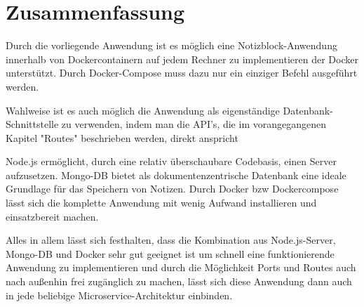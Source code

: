 
\chapter{Zusammenfassung}
\label{ch:Zusammenfassung}

Durch die vorliegende Anwendung ist es möglich eine Notizblock-Anwendung innerhalb von Dockercontainern auf jedem Rechner zu implementieren der Docker unterstützt.
Durch Docker-Compose muss dazu nur ein einziger Befehl ausgeführt werden.

Wahlweise ist es auch möglich die Anwendung als eigenständige Datenbank-Schnittstelle zu verwenden, indem man die API's, die im vorangegangenen Kapitel "Routes" beschrieben werden, direkt anspricht

Node.js ermöglicht, durch eine relativ überschaubare Codebasis, einen Server aufzusetzen.
Mongo-DB bietet als dokumentenzentrische Datenbank eine ideale Grundlage für das Speichern von Notizen.
Durch Docker bzw Dockercompose lässt sich die komplette Anwendung mit wenig Aufwand installieren und einsatzbereit machen.

Alles in allem lässt sich festhalten, dass die Kombination aus Node.js-Server, Mongo-DB und Docker sehr gut geeignet ist um schnell eine funktionierende Anwendung zu implementieren und durch die Möglichkeit Ports und Routes auch nach außenhin frei zugänglich zu machen, lässt sich diese Anwendung dann auch in jede beliebige Microservice-Architektur einbinden. 